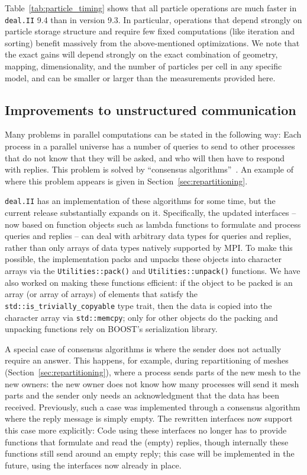 \documentclass{ansarticle-preprint}
\newcommand{\specialword}[1]{\texttt{#1}}
\newcommand{\dealii}{{\specialword{deal.II}}\xspace}
\begin{document}
Table~\ref{tab:particle_timing} shows that all particle operations are
much faster in \dealii 9.4 than in version 9.3. In particular, operations that depend strongly on particle storage structure and require few fixed computations (like iteration and sorting) benefit massively from the above-mentioned optimizations. We note that the exact gains will depend strongly on the exact combination of geometry, mapping, dimensionality, and the number of particles per cell in any specific model, and can be smaller or larger than the measurements provided here.


\subsection{Improvements to unstructured communication}
\label{sec:CA}

Many problems in parallel computations can be stated in the following
way: Each process in a parallel universe has a number of queries to
send to other processes that do not know that they will be asked, and
who will then have to respond with replies. This problem is solved by
``consensus algorithms''~\cite{hoefler2010scalable}. An example of where this problem appears is
given in Section~\ref{sec:repartitioning}.

\dealii{} has an implementation of these algorithms for some time,
but the current release substantially expands on it. Specifically, the
updated interfaces -- now based on function objects such as lambda
functions to formulate and process queries and replies -- can deal
with arbitrary data types for queries and replies, rather than only
arrays of data types natively supported by MPI. To make this possible,
the implementation packs and unpacks these objects into character
arrays via the \texttt{Utilities::pack()} and
\texttt{Utilities::unpack()} functions. We have also worked on making
these functions efficient: if the object to be packed is an array
(or array of arrays) of elements that satisfy the
\texttt{std::is\_trivially\_copyable} type trait, then the data is
copied into the character array via \texttt{std::memcpy}; only for
other objects do the packing and unpacking functions rely on BOOST's
serialization library.

A special case of consensus algorithms is where the sender does not
actually require an answer. This happens, for example, during repartitioning
of meshes (Section~\ref{sec:repartitioning}), where a process sends parts of
the new mesh to the new owners: the new owner does not know how many processes
will send it mesh parts and the sender only needs an acknowledgment that the
data has been received. Previously, such a case was implemented through a consensus
algorithm where the reply message is simply empty.
The rewritten interfaces now support this case more explicitly: Code using
these interfaces no longer has to provide functions that formulate
and read the (empty) replies, though internally these functions still
send around an empty reply; this case will be implemented in the
future, using the interfaces now already in place.
\end{document}
